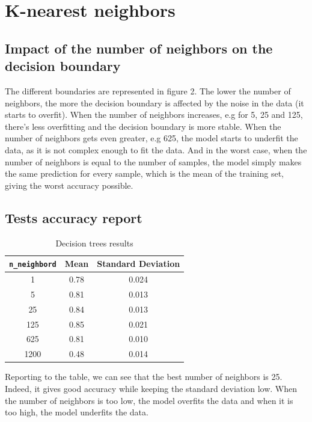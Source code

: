\documentclass[12pt]{article}
\begin{document}
\newpage
\section{K-nearest neighbors}
	\subsection{Impact of the number of neighbors on the decision boundary}
 		The different boundaries are represented in figure 2. The lower the number of neighbors, the more the decision boundary is affected by the noise in the data (it starts to overfit). 
		When the number of neighbors increases, e.g for 5, 25 and 125, there's less overfitting and the decision boundary is more stable.
		When the number of neighbors gets even greater, e.g 625, the model starts to underfit the data, as it is not complex enough to fit the data.
		And in the worst case, when the number of neighbors is equal to the number of samples, the model simply makes the same prediction for every sample, which is the mean of the training set, giving the worst accuracy possible.

\subsection{Tests accuracy report}
	\begin{table}[!h]
		\centering
		\begin{tabular}{|c|c|c|}
		\hline
		\verb|n_neighbord| & Mean & Standard Deviation \\ \hline
		1                                & 0.78 & 0.024              \\ \hline
		5                                & 0.81 & 0.013              \\ \hline
		25                                & 0.84 & 0.013              \\ \hline
		125                               & 0.85 & 0.021              \\ \hline
		625                             & 0.81 & 0.010               \\ \hline
		1200                             & 0.48 & 0.014               \\ \hline

		\end{tabular}
		\caption{Decision trees results}
		\label{tab:results-knn}
	\end{table}
Reporting to the table, we can see that the best number of neighbors is 25. 
Indeed, it gives good accuracy while keeping the standard deviation low. 
When the number of neighbors is too low, the model overfits the data and when it is too high, the model underfits the data.
\end{document}
